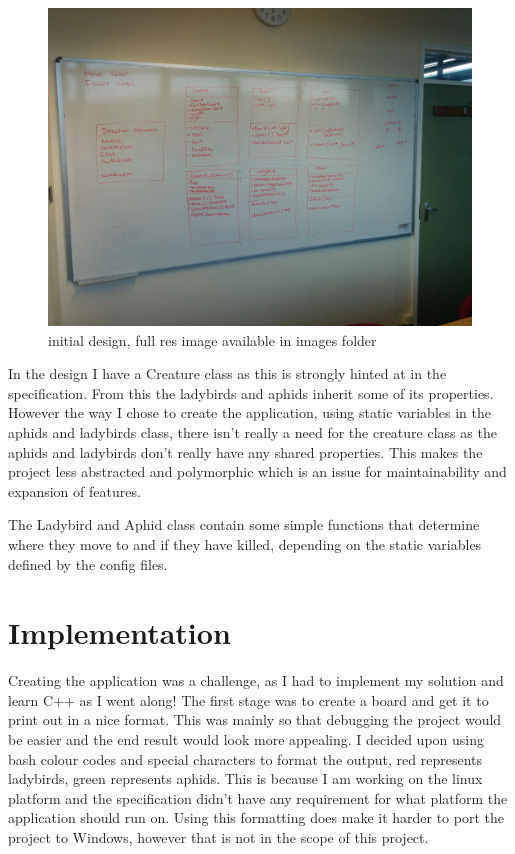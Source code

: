 \documentclass[10pt]{article}
\begin{document}
  \begin{figure}[ht!]
  \centering
  \includegraphics[scale=0.10]{../images/design.jpg}
  \caption{initial design, full res image available in images folder \label{overflow}}
  \end{figure}

  In the design I have a Creature class as this is strongly hinted at in the specification. From this the ladybirds and aphids inherit some of its properties. However the way I chose to create the application, using static variables in the aphids and ladybirds class, there isn't really a need for the creature class as the aphids and ladybirds don't really have any shared properties. This makes the project less abstracted and polymorphic which is an issue for maintainability and expansion of features. 

  The Ladybird and Aphid class contain some simple functions that determine where they move to and if they have killed, depending on the static variables defined by the config files.

  \section{Implementation}
  Creating the application was a challenge, as I had to implement my solution and learn C++ as I went along! The first stage was to create a board and get it to print out in a nice format. This was mainly so that debugging the project would be easier and the end result would look more appealing. I decided upon using bash colour codes and special characters to format the output, red represents ladybirds, green represents aphids. This is because I am working on the linux platform and the specification didn't have any requirement for what platform the application should run on. Using this formatting does make it harder to port the project to Windows, however that is not in the scope of this project.
\end{document}
